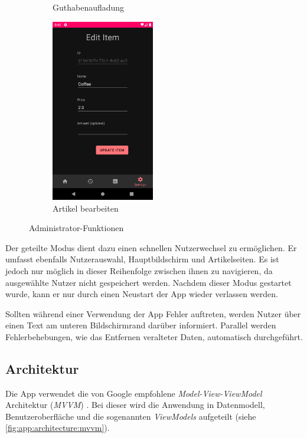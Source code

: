 \documentclass[a4paper, 11pt]{article}
\begin{document}
\begin{figure}[]
\begin{subfigure}{.5\textwidth}
		\caption{Guthabenaufladung}
		\label{fig:app:architecture:functionality:admin:crediting}
	\end{subfigure}
	\begin{subfigure}{.5\textwidth}
		\centering
		\includegraphics[height=8cm,keepaspectratio]{./images/screenshots/edit-item.png}
		\caption{Artikel bearbeiten}
		\label{fig:app:architecture:functionality:admin:edit}
	\end{subfigure}
	\caption{Administrator-Funktionen}
	\label{fig:app:architecture:functionality:admin}
\end{figure}

Der geteilte Modus dient dazu einen schnellen Nutzerwechsel zu ermöglichen.
Er umfasst ebenfalls Nutzerauswahl, Hauptbildschirm und Artikelseiten.
Es ist jedoch nur möglich in dieser Reihenfolge zwischen ihnen zu navigieren, da ausgewählte Nutzer nicht gespeichert werden.
Nachdem dieser Modus gestartet wurde, kann er nur durch einen Neustart der App wieder verlassen werden.

Sollten während einer Verwendung der App Fehler auftreten, werden Nutzer über einen Text am unteren Bildschirmrand darüber informiert.
Parallel werden Fehlerbehebungen, wie das Entfernen veralteter Daten, automatisch durchgeführt.

\subsection{Architektur}
\label{subsec:app:architecture}
Die App verwendet die von Google empfohlene \textit{Model-View-ViewModel} Architektur (\textit{MVVM}) \autocite{androidarchitecture}.
Bei dieser wird die Anwendung in Datenmodell, Benutzeroberfläche und die sogenannten \textit{ViewModels} aufgeteilt (siehe \autoref{fig:app:architecture:mvvm}).
\end{document}
